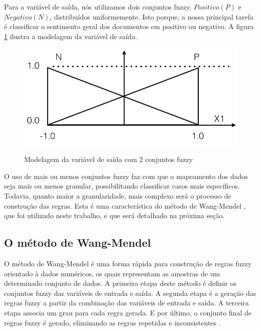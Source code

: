 \documentclass[template.tex]{subfiles}
\begin{document}

Para a variável de saída, nós utilizamos dois conjuntos fuzzy, $Positivo (P)$ e $Negativo (N)$, distribuídos uniformemente. Isto porque, a nossa principal tarefa é classificar o sentimento geral dos documentos em positivo ou negativo. A figura \ref{figura:conjuntos_fuzzy_saida} ilustra a modelagem da variável de saída.

\begin{figure}[H]
\caption{Modelagem da variável de saída com 2 conjuntos fuzzy}
\centering
\includegraphics[scale=0.45]{conjuntos_fuzzy_saida.png}
\label{figura:conjuntos_fuzzy_saida}
\end{figure}

O uso de mais ou menos conjuntos fuzzy faz com que o mapeamento dos dados seja mais ou menos granular, possibilitando classificar casos mais específicos. Todavia, quanto maior a granularidade, mais complexo será o processo de construção das regras. Esta é uma característica do método de Wang-Mendel \cite{wang1992generating}, que foi utilizado neste trabalho, e que será detalhado na próxima seção.


\subsection{O método de Wang-Mendel}

O método de Wang-Mendel é uma forma rápida para construção de regras fuzzy orientado à dados numéricos, os quais representam as amostras de um determinado conjunto de dados. A primeira etapa deste método é definir os conjuntos fuzzy das variáveis de entrada e saída. A segunda etapa é a geração das regras fuzzy a partir da combinação das variáveis de entrada e saída. A terceira etapa associa um grau para cada regra gerada. E por último, o conjunto final de regras fuzzy é gerado, eliminando as regras repetidas e inconsistentes \cite{wang1992generating}.
\end{document}
